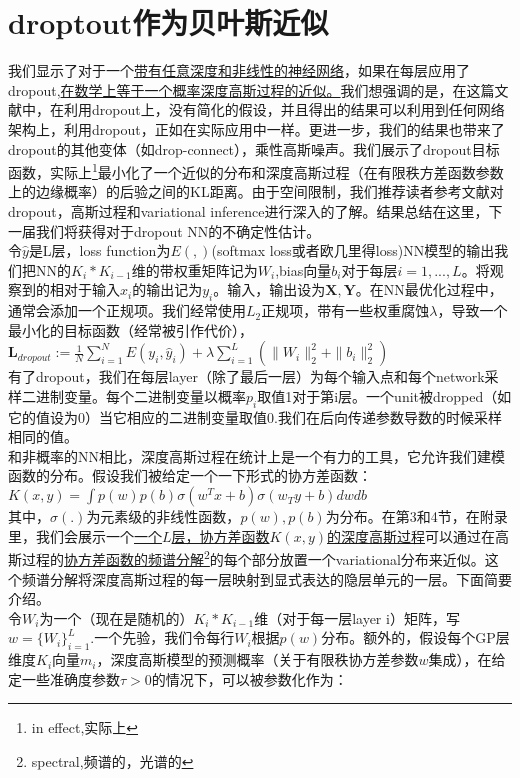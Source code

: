 \documentclass[2pt,a4paper]{article}
\begin{document}
\section{droptout作为贝叶斯近似}
我们显示了对于一个\underline{带有任意深度和非线性的神经网络}，如果在每层应用了dropout,\underline{在数学上等于一个概率深度高斯过程的近似。}我们想强调的是，在这篇文献中，在利用dropout上，没有简化的假设，并且得出的结果可以利用到任何网络架构上，利用dropout，正如在实际应用中一样。更进一步，我们的结果也带来了dropout的其他变体（如drop-connect），乘性高斯噪声。我们展示了dropout目标函数，实际上\footnote{in effect,实际上}最小化了一个近似的分布和深度高斯过程（在有限秩方差函数参数上的边缘概率）的后验之间的KL距离。由于空间限制，我们推荐读者参考文献对dropout，高斯过程和variational inference进行深入的了解。结果总结在这里，下一届我们将获得对于dropout NN的不确定性估计。\\
令$\hat{y}$是L层，loss function为$E(,)$(softmax loss或者欧几里得loss)NN模型的输出我们把NN的$K_i*K_{i-1}$维的带权重矩阵记为$W_i$,bias向量$b_i$对于每层$i=1,...,L$。将观察到的相对于输入$x_i$的输出记为$y_i$。输入，输出设为$\mathbf{X},\mathbf{Y}$。在NN最优化过程中，通常会添加一个正规项。我们经常使用$L_2$正规项，带有一些权重腐蚀$\lambda$，导致一个最小化的目标函数（经常被引作代价），\\
$\mathbf{L}_{dropout}:=\frac{1}{N}\sum_{i=1}^NE(y_i,\hat{y}_i)+\lambda\sum_{i=1}^L(\parallel W_i\parallel_2^2+\parallel b_i\parallel_2^2)$\\
有了dropout，我们在每层layer（除了最后一层）为每个输入点和每个network采样二进制变量。每个二进制变量以概率$p_i$取值1对于第i层。一个unit被dropped（如它的值设为0）当它相应的二进制变量取值0.我们在后向传递参数导数的时候采样相同的值。\\
和非概率的NN相比，深度高斯过程在统计上是一个有力的工具，它允许我们建模函数的分布。假设我们被给定一个一下形式的协方差函数：\\
$K(x,y)=\int p(w)p(b)\sigma(w^Tx+b)\sigma(w_Ty+b)dwdb$ \\
其中，$\sigma(.)$为元素级的非线性函数，$p(w),p(b)$为分布。在第3和4节，在附录里，我们会展示一个\underline{一个$L$层，协方差函数$K(x,y)$的深度高斯过程}可以通过在高斯过程的\underline{协方差函数的频谱分解}\footnote{spectral,频谱的，光谱的}的每个部分放置一个variational分布来近似。这个频谱分解将深度高斯过程的每一层映射到显式表达的隐层单元的一层。下面简要介绍。\\
令$W_i$为一个（现在是随机的）$K_i*K_{i-1}$维（对于每一层layer i）矩阵，写$w=\{W_i\}_{i=1}^L$.一个先验，我们令每行$W_i$根据$p(w)$分布。额外的，假设每个GP层维度$K_i$向量$m_i$，深度高斯模型的预测概率（关于有限秩协方差参数$w$集成），在给定一些准确度参数$\tau >0$的情况下，可以被参数化作为：\\
\end{document}
